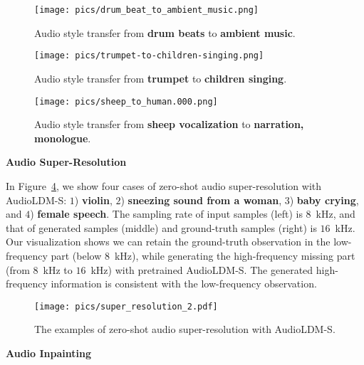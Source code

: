 \vspace{0.5cm}

\begin{figure}[htbp]
    \centering
    \texttt{[image: pics/drum\_beat\_to\_ambient\_music.png]}
    \caption{Audio style transfer from \textbf{drum beats} to \textbf{ambient music}.}
    \label{fig:demo-style-transfer-1}
\end{figure}

\begin{figure}[htbp]
    \centering
    \texttt{[image: pics/trumpet-to-children-singing.png]}
    \caption{Audio style transfer from \textbf{trumpet} to \textbf{children singing}.}
    \label{fig:demo-style-transfer-2}
\end{figure}

\begin{figure}[htbp]
    \centering
    \texttt{[image: pics/sheep\_to\_human.000.png]}
    \caption{Audio style transfer from \textbf{sheep vocalization} to \textbf{narration, monologue}.}
    \label{fig:demo-style-transfer-3}
\end{figure}

\newpage

\textbf{Audio Super-Resolution}

In Figure~\ref{fig:demo-super-resolution}, we show four cases of zero-shot audio super-resolution with AudioLDM-S: $1$) \textbf{violin}, $2$) \textbf{sneezing sound from a woman}, $3$) \textbf{baby crying}, and $4$) \textbf{female speech}. The sampling rate of input samples (left) is $8$~kHz, and that of generated samples (middle) and ground-truth samples (right) is $16$~kHz. Our visualization shows we can retain the ground-truth observation in the low-frequency part (below $8$~kHz), while generating the high-frequency missing part (from $8$~kHz to $16$~kHz) with pretrained AudioLDM-S. The generated high-frequency information is consistent with the low-frequency observation.  

\vspace{0.5cm}

\begin{figure}[htbp]
    \centering
    \texttt{[image: pics/super\_resolution\_2.pdf]}
    \caption{The examples of zero-shot audio super-resolution with AudioLDM-S.}
    \label{fig:demo-super-resolution}
\end{figure}

\newpage

\textbf{Audio Inpainting}


